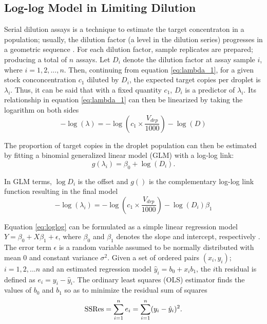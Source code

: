 \subsection{Log-log Model in Limiting Dilution}
\label{sec:targetconc_ch3_loglog}
Serial dilution assays is a technique to estimate the target concentraton in a population; usually, the dilution factor (a level in the dilution series) progresses in a geometric sequence \cite{Deng2017}. For each dilution factor, sample replicates are prepared; producing a total of \(n\) assays. Let \(D_i\) denote the dilution factor at assay sample \(i\), where \(i={1,2,...,n}\). Then, continuing from equation \ref{eq:lambda_1}, for a given stock conconcentration \(c_1\) diluted by \(D_i\), the expected target copies per droplet is \(\lambda_i\). Thus, it can be said that with a fixed quantity \(c_1\), \(D_i\) is a predictor of \(\lambda_i\). Its relationship in equation \ref{eq:lambda_1} can then be linearized by taking the logarithm on both sides
\begin{equation}
    -\log{(\lambda)} = -\log{(c_1 \times \frac{V_{drp}}{1000})} - \log{(D)} \label{eq:loglambda}
\end{equation}

The proportion of target copies in the droplet population can then be estimated by fitting a binomial generalized linear model (GLM) with a log-log link:
\[
    g(\lambda_i) = \beta_0 + \log{(D_i)}.
\]

In GLM terms, \(\log{D_i}\) is the offset and \(g()\) is the complementary log-log link function resulting in the final model
\begin{equation}
    -\log{(\lambda_i)} = -\log{(c_1 \times \frac{V_{drp}}{1000})} - \log{(D_i)}\beta_1 \label{eq:loglog}
\end{equation}

Equation \ref{eq:loglog} can be formulated as a simple linear regression model \(Y = \beta_0 + X\beta_1 + \epsilon\), where \(\beta_0\) and \(\beta_1\) denotes the slope and intercept, respectively \cite{Walpole2011}. The error term \(\epsilon\) is a random variable assumed to be normally distributed with mean 0 and constant variance \(\sigma^2\). Given a set of ordered pairs {\((x_i,y_i);\) \(i=1,2,...n\)} and an estimated regression model \(\hat{y}_i = b_0 + x_ib_1\), the \(i\)th residual is defined as \(e_i = y_i - \hat{y}_i\). The ordinary least squares (OLS) estimator finds the values of \(b_0\) and \(b_1\) so as to minimize the residual sum of squares
\[
    \textup{SSRes} = \sum_{i=1}^{n}e_i = \sum_{i=1}^{n}(y_i - \hat{y}_i)^2.
\]

